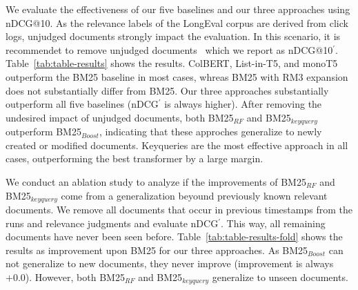 We evaluate the effectiveness of our five baselines and our three approaches using nDCG@10. As the relevance labels of the LongEval corpus are derived from click logs, unjudged documents strongly impact the evaluation. In this scenario, it is recommendet to remove unjudged documents~\cite{sakai:2007} which we report as nDCG@10$^{'}$. Table~\ref{tab:table-results} shows the results. ColBERT, List-in-T5, and monoT5 outperform the BM25 baseline in most cases, whreas BM25 with RM3 expansion does not substantially differ from BM25. Our three approaches substantially outperform all five baselines (nDCG$^{'}$ is always higher). After removing the undesired impact of unjudged documents, both BM25$_{RF}$ and BM25$_{keyquery}$ outperform BM25$_{Boost}$, indicating that these approches generalize to newly created or modified documents. Keyqueries are the most effective approach in all cases, outperforming the best transformer by a large margin.



We conduct an ablation study to analyze if the improvements of BM25$_{RF}$ and BM25$_{keyquery}$ come from a generalization beyound previously known relevant documents. We remove all documents that occur in previous timestamps from the runs and relevance judgments and evaluate nDCG$^{'}$. This way, all remaining documents have never been seen before. Table~\ref{tab:table-results-fold} shows the results as improvement upon BM25 for our three approaches. As BM25$_{Boost}$ can not generalize to new documents, they never improve (improvement is always~$+0.0$). However, both BM25$_{RF}$ and BM25$_{keyquery}$ generalize to unseen documents.
